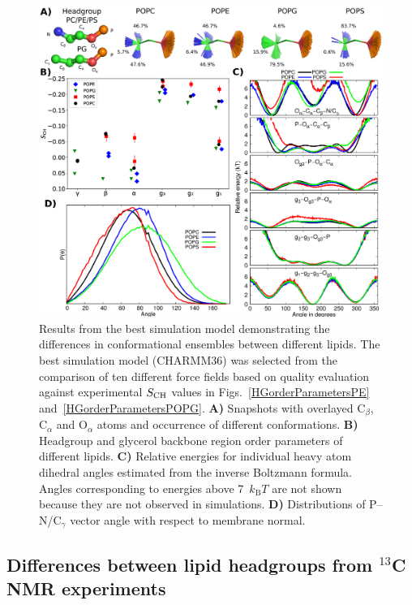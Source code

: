 \documentclass[aps,prl,superscriptaddress,twocolumn]{revtex4}
\begin{document}
\begin{figure}[bt]
  \centering
   \includegraphics[width=18.0cm]{./Figs/figure2.eps}
   \caption{\label{structures}
     Results from the best simulation model demonstrating the differences in conformational ensembles between different lipids.
     The best simulation model (CHARMM36) was selected from the comparison of ten different force fields based on quality evaluation against experimental $S_{\rm{CH}}$ values in Figs.~\ref{HGorderParametersPE} and~\ref{HGorderParametersPOPG}.
     \textbf{A)} Snapshots with overlayed C$_\beta$, C$_\alpha$ and O$_\alpha$ atoms and occurrence of different conformations.
     \textbf{B)} Headgroup and glycerol backbone region order parameters of different lipids.
     \textbf{C)} Relative energies for individual heavy atom dihedral angles estimated from the inverse Boltzmann formula.
     Angles corresponding to energies above 7~$k_\mathrm{B}T$ are not shown because they are not observed in simulations.
     \textbf{D)} Distributions of P--N/C$_\gamma$ vector angle with respect to membrane normal.
  }
\end{figure}


\subsection{Differences between lipid headgroups from $^{13}$C NMR experiments}
\end{document}
